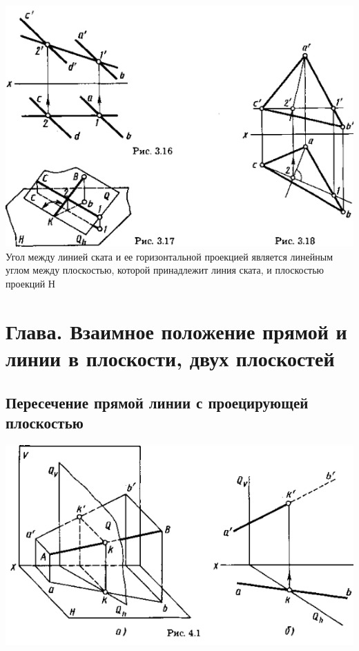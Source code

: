\documentclass[a4paper, 12pt]{article}
\begin{document}
\includegraphics{img/332.png}\\


Угол между линией ската и ее горизонтальной проекцией является линейным углом между плоскостью, которой принадлежит линия ската, и плоскостью проекций Н\\

\section{ Глава. Взаимное положение прямой и линии в плоскости, двух плоскостей}

\subsection{Пересечение прямой линии с проецирующей плоскостью}

\includegraphics{img/411.png}\\
\end{document}
